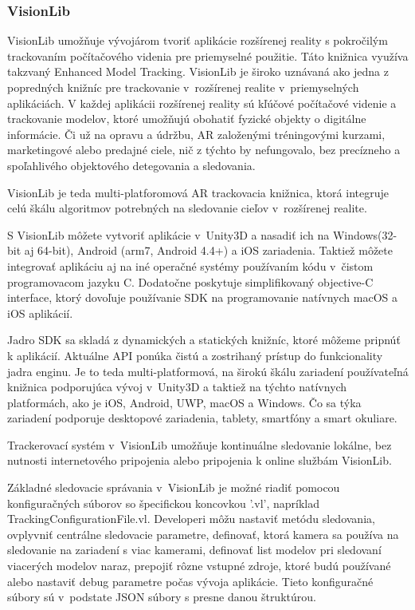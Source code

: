 \subsubsection{VisionLib}

VisionLib umožňuje vývojárom tvoriť aplikácie rozšírenej reality s pokročilým trackovaním počítačového videnia pre priemyselné použitie. Táto knižnica využíva takzvaný Enhanced Model Tracking. VisionLib je široko uznávaná ako jedna z popredných knižníc pre trackovanie v~rozšírenej realite v~priemyselných aplikáciách. V každej aplikácii rozšírenej reality sú kľúčové počítačové videnie a trackovanie modelov, ktoré umožňujú obohatiť fyzické objekty o digitálne informácie. Či už na opravu a údržbu, AR založenými tréningovými kurzami, marketingové alebo predajné ciele, nič z týchto by nefungovalo, bez precízneho a spoľahlivého objektového detegovania a sledovania.

VisionLib je teda multi-platforomová AR trackovacia knižnica, ktorá integruje celú škálu algoritmov potrebných na sledovanie cieľov v~rozšírenej realite.  

S VisionLib môžete vytvoriť aplikácie v~Unity3D a nasadiť ich na Windows(32-bit aj 64-bit), Android (arm7, Android 4.4+) a iOS zariadenia. Taktiež môžete integrovať aplikáciu aj na iné operačné systémy používaním kódu v~čistom programovacom jazyku C. Dodatočne poskytuje simplifikovaný objective-C interface, ktorý dovoľuje používanie SDK na programovanie natívnych macOS a iOS aplikácií. 

Jadro SDK sa skladá z dynamických a statických knižníc, ktoré môžeme pripnúť k aplikácií. Aktuálne API ponúka čistú a zostrihaný prístup do funkcionality jadra enginu. Je to teda multi-platformová, na širokú škálu zariadení používateľná knižnica podporujúca vývoj v~Unity3D a taktiež na týchto natívnych platformách, ako je iOS, Android, UWP, macOS a Windows. Čo sa týka zariadení podporuje desktopové zariadenia, tablety, smartfóny a smart okuliare. 

Trackerovací systém v~VisionLib umožňuje kontinuálne sledovanie lokálne, bez nutnosti internetového pripojenia alebo pripojenia k online službám VisionLib.

Základné sledovacie správania v~VisionLib je možné riadiť pomocou konfiguračných súborov so špecifickou koncovkou '.vl', napríklad TrackingConfigurationFile.vl. Developeri môžu nastaviť metódu sledovania, ovplyvniť centrálne sledovacie parametre, definovať, ktorá kamera sa používa na sledovanie na zariadení s viac kamerami, definovať list modelov pri sledovaní viacerých modelov naraz, prepojiť rôzne vstupné zdroje, ktoré budú používané alebo nastaviť debug parametre počas vývoja aplikácie. Tieto konfiguračné súbory sú v~podstate JSON súbory s presne danou štruktúrou.

